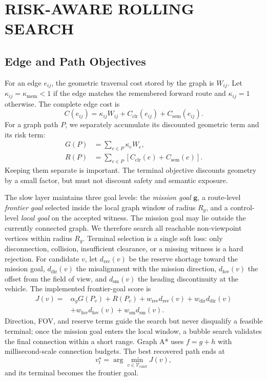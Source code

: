\documentclass[letterpaper,10pt,conference]{ieeeconf}
\newcommand{\vect}[1]{\boldsymbol{#1}}
\begin{document}
\section{RISK-AWARE ROLLING SEARCH}
\subsection{Edge and Path Objectives}
For an edge $e_{ij}$, the geometric traversal cost stored by the graph is
$W_{ij}$.
Let $\kappa_{ij}=\kappa_{\mathrm{mem}}<1$ if the edge matches the remembered
forward route and $\kappa_{ij}=1$ otherwise.
The complete edge cost is
\begin{equation}
 C(e_{ij})=\kappa_{ij}W_{ij}
          +C_{\mathrm{clr}}(e_{ij})+C_{\mathrm{sem}}(e_{ij}).
\label{eq:edge_cost}
\end{equation}
For a graph path $P$, we separately accumulate its discounted geometric term
and its risk term:
\begin{align}
 G(P)&=\sum_{e\in P}\kappa_eW_e,\\
 R(P)&=\sum_{e\in P}
       \left[C_{\mathrm{clr}}(e)+C_{\mathrm{sem}}(e)\right].
\end{align}
Keeping them separate is important.
The terminal objective discounts geometry by a small factor, but must not
discount safety and semantic exposure.

The slow layer maintains three goal levels: the \emph{mission goal}
$\vect{g}$, a route-level \emph{frontier goal} selected inside the local
graph window of radius $R_g$, and a control-level \emph{local goal} on the
accepted witness.
The mission goal may lie outside the currently connected graph.
We therefore search all reachable non-viewpoint vertices within radius
$R_g$.
Terminal selection is a single soft loss: only disconnection, collision,
insufficient clearance, or a missing witness is a hard rejection.
For candidate $v$, let $d_{\mathrm{rsv}}(v)$ be the reserve shortage toward
the mission goal, $d_{\mathrm{dir}}(v)$ the misalignment with the mission
direction, $d_{\mathrm{fov}}(v)$ the offset from the field of view, and
$d_{\mathrm{sm}}(v)$ the heading discontinuity at the vehicle.
The implemented frontier-goal score is
\begin{align}
 J(v)={}&\alpha_gG(P_v)+R(P_v)
       +w_{\mathrm{rsv}}d_{\mathrm{rsv}}(v)+w_{\mathrm{dir}}d_{\mathrm{dir}}(v)
       \nonumber\\
       &+w_{\mathrm{fov}}d_{\mathrm{fov}}(v)
       +w_{\mathrm{sm}}d_{\mathrm{sm}}(v).
\label{eq:terminal}
\end{align}
Direction, FOV, and reserve terms guide the search but never disqualify a
feasible terminal; once the mission goal enters the local window, a bubble
search validates the final connection within a short range.
Graph A* uses $f=g+h$ with millisecond-scale connection budgets.
The best recovered path ends at
\begin{equation}
 v_t^\star=\arg\min_{v\in\mathcal{V}_{\mathrm{cand}}}J(v),
\end{equation}
and its terminal becomes the frontier goal.
\end{document}
